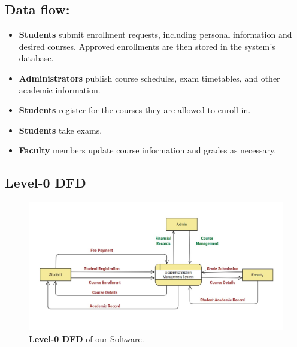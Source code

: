 \documentclass[12pt,a4paper]{article}
\begin{document}
\subsection*{Data flow:}
\begin{itemize}
    \item \textbf{Students} submit enrollment requests, including personal information and desired courses. Approved enrollments are then stored in the system's database.
    \item \textbf{Administrators} publish course schedules, exam timetables, and other academic information.
    \item \textbf{Students} register for the courses they are allowed to enroll in.
    \item \textbf{Students} take exams.
    \item \textbf{Faculty} members update course information and grades as necessary.
\end{itemize}

\subsection{Level-0 DFD}
\begin{figure}[H]
    \centering
        \includegraphics[scale=0.5]{Level_0_DFD.jpg} 
    \caption{\textbf{Level-0 DFD} of our Software.}
\end{figure}
\end{document}
